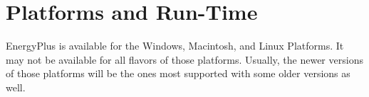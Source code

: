 \chapter{Platforms and Run-Time}\label{platforms-and-run-time}

EnergyPlus is available for the Windows, Macintosh, and Linux Platforms. It may not be available for all flavors of those platforms. Usually, the newer versions of those platforms will be the ones most supported with some older versions as well.
